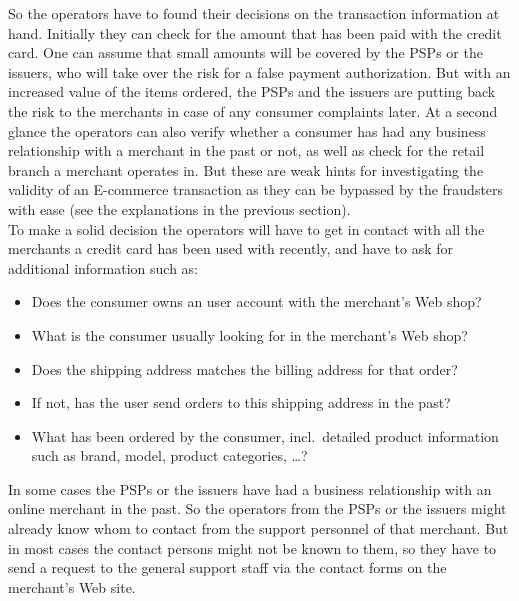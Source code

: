 So the operators have to found their decisions on the transaction information at hand. Initially they can check for the amount that has been paid with the credit card. One can assume that small amounts will be covered by the \gls{PSP}s or the issuers, who will take over the risk for a false payment authorization. But with an increased value of the items ordered, the \gls{PSP}s and the issuers are putting back the risk to the merchants in case of any consumer complaints later. At a second glance the operators can also verify whether a consumer has had any business relationship with a merchant in the past or not, as well as check for the retail branch a merchant operates in. But these are weak hints for investigating the validity of an \gls{E-commerce} transaction as they can be bypassed by the fraudsters with ease (see the explanations in the previous section). \\

To make a solid decision the operators will have to get in contact with all the merchants a credit card has been used with recently, and have to ask for additional information such as:\@

\begin{itemize}
  \item Does the consumer owns an user account with the merchant's Web shop?
  \item What is the consumer usually looking for in the merchant's Web shop?
  \item Does the shipping address matches the billing address for that order?
  \item If not, has the user send orders to this shipping address in the past?
  \item What has been ordered by the consumer, incl.\ detailed product information such as brand, model, product categories, \ldots?
\end{itemize}

In some cases the \gls{PSP}s or the issuers have had a business relationship with an online merchant in the past. So the operators from the \gls{PSP}s or the issuers might already know whom to contact from the support personnel of that merchant. But in most cases the contact persons might not be known to them, so they have to send a request to the general support staff via the contact forms on the merchant's Web site. \\

